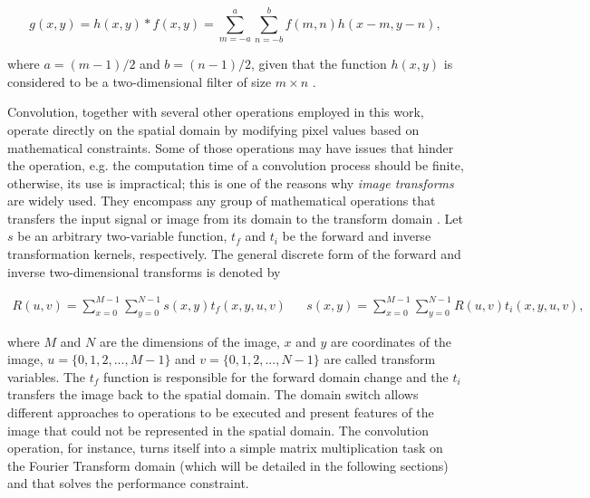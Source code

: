 \begin{equation}
\label{eqn:2d_discrete_convolution}
g(x,y) = h(x,y) \ast f(x,y) = 
        \sum_{m=-a}^{a}
        \sum_{n=-b}^{b}
        f(m,n) h(x-m,y-n),
\end{equation}

\noindent where $a = (m-1)/2$ and $b = (n-1)/2$, given that the function $h(x,y)$ is considered to be a two-dimensional filter of size $m \times n$ \cite{gonzalez2018digital}.

Convolution, together with several other operations employed in this work, operate directly on the spatial domain by modifying pixel values based on mathematical constraints. Some of those operations may have issues that hinder the operation, e.g. the computation time of a convolution process should be finite, otherwise, its use is impractical; this is one of the reasons why \emph{image transforms} are widely used. They encompass any group of mathematical operations that transfers the input signal or image from its domain to the transform domain \cite{gonzalez2008digital}. Let $s$ be an arbitrary two-variable function, $t_{f}$ and $t_{i}$ be the forward and inverse transformation kernels, respectively. The general discrete form of the forward and inverse two-dimensional transforms is denoted by 

\begin{align}
\label{eqn:generic_transform}
R(u,v) = 
\sum_{x=0}^{M-1}
\sum_{y=0}^{N-1}s(x,y)t_{f}(x,y,u,v)
&&
s(x,y) = 
\sum_{x=0}^{M-1}
\sum_{y=0}^{N-1}R(u,v)t_{i}(x,y,u,v),
\end{align}

\noindent where $M$ and $N$ are the dimensions of the image, $x$ and $y$ are coordinates of the image, $u = \{0,1,2,...,M-1\}$ and $v = \{0,1,2,...,N-1\}$ are called transform variables. The $t_{f}$ function is responsible for the forward domain change and the $t_{i}$ transfers the image back to the spatial domain. The domain switch allows different approaches to operations to be executed and present features of the image that could not be represented in the spatial domain. The convolution operation, for instance, turns itself into a simple matrix multiplication task on the Fourier Transform domain (which will be detailed in the following sections) and that solves the performance constraint.